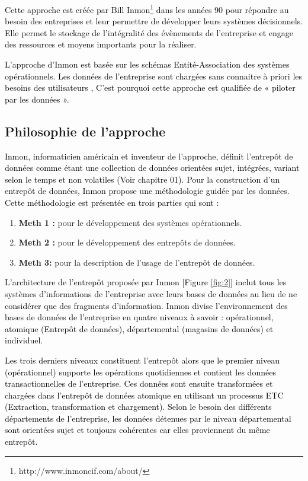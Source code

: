 \documentclass[a4paper,12pt]{report}
\begin{document}
\textcolor{black}{Cette approche est créée par Bill Inmon\footnote{http://www.inmoncif.com/about/} dans les années 90 pour répondre au besoin des entreprises et leur permettre de développer leurs systèmes décisionnels. Elle permet le stockage de l’intégralité des évènements de l’entreprise et engage des ressources et moyens importants pour la réaliser.}

\textcolor{black}{L'approche d'Inmon est basée sur les schémas Entité-Association des systèmes opérationnels. Les données de l’entreprise sont chargées sans connaitre à priori les besoins des utilisateurs \citep{denis2008}, C’est pourquoi cette approche est qualifiée de « piloter par les données ».}



\subsection{Philosophie de l’approche}
\textcolor{black}{Inmon, informaticien américain et inventeur de l’approche, définit l’entrepôt de données comme étant une collection de données orientées sujet, intégrées, variant selon le temps et non volatiles (Voir chapitre 01).}
\textcolor{black}{Pour la construction d’un entrepôt de données, Inmon propose une méthodologie guidée par les données. Cette méthodologie est présentée en trois parties qui sont :}

\begin{enumerate}
	\item \textbf{Meth 1 :} pour le développement des systèmes opérationnels.
	\item \textbf{Meth 2 :} pour le développement des entrepôts de données.
	\item \textbf{Meth 3:} pour la description de l’usage de l’entrepôt de données.
\end{enumerate}

\textcolor{black}{L’architecture de l’entrepôt proposée par Inmon [Figure \ref{fig:2}] inclut tous les systèmes d’informations de l’entreprise avec leurs bases de données au lieu de ne considérer que des fragments d’information. Inmon divise l’environnement des bases de données de l’entreprise en quatre niveaux à savoir : opérationnel, atomique (Entrepôt de données), départemental (magasins de données) et individuel.}

\textcolor{black}{Les trois derniers niveaux constituent l’entrepôt alors que le premier niveau (opérationnel) supporte les opérations quotidiennes et contient les données transactionnelles de l’entreprise. Ces données sont ensuite transformées et chargées dans l’entrepôt de données atomique en utilisant un processus ETC (Extraction, transformation et chargement). Selon le besoin des différents départements de l’entreprise, les données détenues par le niveau départemental sont orientées sujet et toujours cohérentes car elles proviennent du même entrepôt.}
\end{document}
